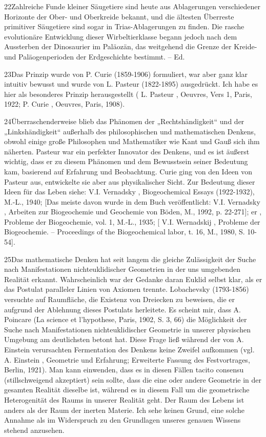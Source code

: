\documentclass[11pt,a4paper]{book}
\begin{document}
22Zahlreiche Funde kleiner Säugetiere sind heute aus Ablagerungen verschiedener Horizonte der Ober- und Oberkreide bekannt, und die ältesten Überreste primitiver Säugetiere sind sogar in Trias-Ablagerungen zu finden. Die rasche evolutionäre Entwicklung dieser Wirbeltierklasse begann jedoch nach dem Aussterben der Dinosaurier im Paläozän, das weitgehend die Grenze der Kreide- und Paläogenperioden der Erdgeschichte bestimmt. -- Ed.



23Das Prinzip wurde von P. Curie (1859-1906) formuliert, war aber ganz klar intuitiv bewusst und wurde von L. Pasteur (1822-1895) ausgedrückt. Ich habe es hier als besonderes Prinzip herausgestellt ( L. Pasteur , Oeuvres, Vers 1, Paris, 1922; P. Curie , Oeuvres, Paris, 1908).



24Überraschenderweise blieb das Phänomen der „Rechtshändigkeit“ und der „Linkshändigkeit“ außerhalb des philosophischen und mathematischen Denkens, obwohl einige große Philosophen und Mathematiker wie Kant und Gauß sich ihm näherten. Pasteur war ein perfekter Innovator des Denkens, und es ist äußerst wichtig, dass er zu diesem Phänomen und dem Bewusstsein seiner Bedeutung kam, basierend auf Erfahrung und Beobachtung. Curie ging von den Ideen von Pasteur aus, entwickelte sie aber aus physikalischer Sicht. Zur Bedeutung dieser Ideen für das Leben siehe: V.I. Vernadsky , Biogeochemical Essays (1922-1932), M.-L., 1940; [Das meiste davon wurde in dem Buch veröffentlicht: V.I. Vernadsky , Arbeiten zur Biogeochemie und Geochemie von Böden, M., 1992, p. 22-271]; er , Probleme der Biogeochemie, vol. 1, M.-L., 1935; [ V.I. Wernadskij , Probleme der Biogeochemie. -- Proceedings of the Biogeochemical labor, t. 16, M., 1980, S. 10-54].



25Das mathematische Denken hat seit langem die gleiche Zulässigkeit der Suche nach Manifestationen nichteuklidischer Geometrien in der uns umgebenden Realität erkannt. Wahrscheinlich war der Gedanke daran Euklid selbst klar, als er das Postulat paralleler Linien von Axiomen trennte. Lobachevsky (1793-1856) versuchte auf Raumfläche, die Existenz von Dreiecken zu beweisen, die er aufgrund der Ablehnung dieses Postulats herleitete. Es scheint mir, dass A. Poincare (La science et l'hypothese, Paris, 1902, S. 3, 66) die Möglichkeit der Suche nach Manifestationen nichteuklidischer Geometrie in unserer physischen Umgebung am deutlichsten betont hat. Diese Frage ließ während der von A. Einstein verursachten Fermentation des Denkens keine Zweifel aufkommen (vgl. A. Einstein , Geometrie und Erfahrung; Erweiterte Fassung des Festvortrages, Berlin, 1921). Man kann einwenden, dass es in diesen Fällen tacito consensu (stillschweigend akzeptiert) sein sollte, dass die eine oder andere Geometrie in der gesamten Realität dieselbe ist, während es in diesem Fall um die geometrische Heterogenität des Raums in unserer Realität geht. Der Raum des Lebens ist anders als der Raum der inerten Materie. Ich sehe keinen Grund, eine solche Annahme als im Widerspruch zu den Grundlagen unseres genauen Wissens stehend anzusehen.
\end{document}
